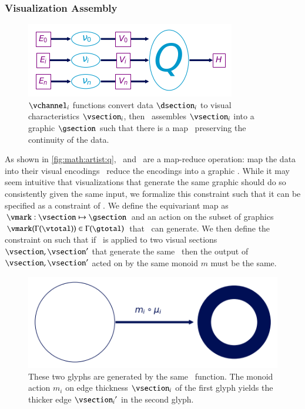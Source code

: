 \documentclass[journal]{vgtc}                %
\begin{document}
\subsubsection{Visualization Assembly}
\label{sec:math:artist:q}
\begin{figure}[htb]
  \centering
  \includegraphics[width=\columnwidth]{path_of_q}
  \caption{$\vchannel_i$ functions convert data $\dsection_i$ to visual characteristics $\vsection_i$, then \vmark\ assembles $\vsection_i$ into a graphic $\gsection$ such that there is a map \vindex\ preserving the continuity of the data.} 
  \label{fig:math:artist:q}
\end{figure}
As shown in \autoref{fig:math:artist:q}, \vchannel\ and \vmark\ are a map-reduce operation: map the data into their visual encodings \vsection\ reduce the encodings into a graphic \gsection. While it may seem intuitive that visualizations that generate the same graphic should do so consistently given the same input, we formalize this constraint such that it can be specified as a constraint of \vmark. We define the equivariant map as  $\vmark: \vsection \mapsto \gsection$ and an action on the subset of graphics $\vmark(\Gamma(\vtotal)) \in \Gamma(\gtotal)$ that \vmark\ can generate. We then define the constraint on \vmark such that if \vmark\ is applied to two visual sections $\vsection,\vsection^{\prime}$ that generate the same \gsection\, then the output of $\vsection,\vsection^{\prime}$ acted on by the same monoid $m$ must be the same.

\begin{figure}[htb]
  \centering
  \includegraphics[width=\columnwidth]{diff_type_q.png}
  \caption{These two glyphs are generated by the same \vmark\ function. The monoid 
  action $m_i$ on edge thickness $\vsection_i$ of the first glyph yields the thicker edge ${\vsection_i}^{\prime}$ in the second glyph.}
  \label{fig:math:artist:graphic}
\end{figure}
\end{document}
